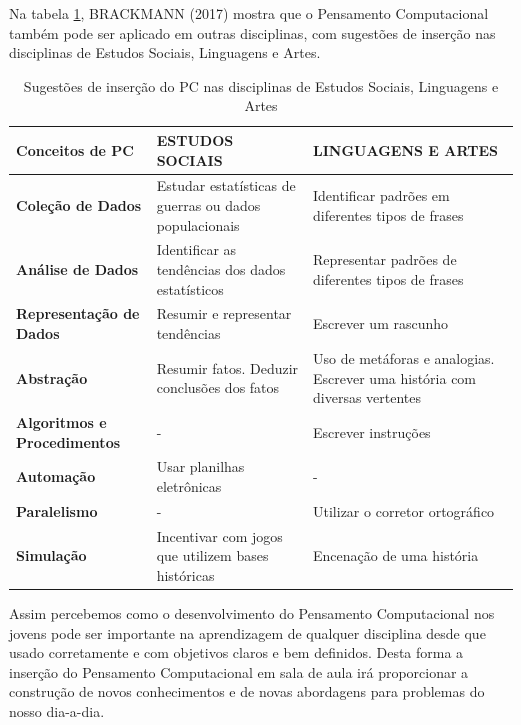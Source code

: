 \documentclass[12pt, openright, a4paper, brazil, english, french, spanish, bibjustif, openany, oneside]{abntex2}
\begin{document}
\newpage

Na tabela \ref{tab2}, BRACKMANN (2017) mostra que o Pensamento Computacional também pode ser aplicado em outras disciplinas, com sugestões de inserção nas disciplinas de Estudos Sociais, Linguagens e Artes. 

\begin{table}[h]
        \centering
        \caption{Sugestões de inserção do PC nas disciplinas de Estudos Sociais, Linguagens e Artes \label{tab2}}
                
        \begin{tabular}{ >{\centering\arraybackslash}m{3cm} >{\centering\arraybackslash}m{5.5cm} >{\centering\arraybackslash}m{6cm}}
            \toprule
            \textbf{Conceitos de PC} & \textbf{ESTUDOS SOCIAIS} & \textbf{LINGUAGENS E ARTES} \\
            \midrule
            \textbf{Coleção de Dados} & Estudar estatísticas de guerras ou dados populacionais  & Identificar padrões em diferentes tipos de frases \\
            \midrule
            \textbf{Análise de Dados} & Identificar as tendências dos dados estatísticos & Representar padrões de diferentes tipos de frases  \\
            \midrule
            \textbf{Representação de Dados} & Resumir e representar tendências & Escrever um rascunho \\
            \midrule
            \textbf{Abstração} & Resumir fatos. Deduzir conclusões dos fatos & Uso de metáforas e analogias. Escrever uma história com diversas vertentes \\
            \midrule
            \textbf{Algoritmos e Procedimentos} & - & Escrever instruções \\
            \midrule
            \textbf{Automação} & Usar planilhas eletrônicas & - \\
            \midrule
            \textbf{Paralelismo} & - & Utilizar o corretor ortográfico \\
            \midrule
            \textbf{Simulação} & Incentivar com jogos que utilizem bases históricas & Encenação de uma história \\
            \bottomrule
        \end{tabular}
    \end{table}

Assim percebemos como o desenvolvimento do Pensamento Computacional nos jovens pode ser importante na aprendizagem de qualquer disciplina desde que usado corretamente e com objetivos claros e bem definidos. Desta forma a inserção do Pensamento Computacional em sala de aula irá proporcionar a construção de novos conhecimentos e de novas abordagens para problemas do nosso dia-a-dia.
\end{document}

